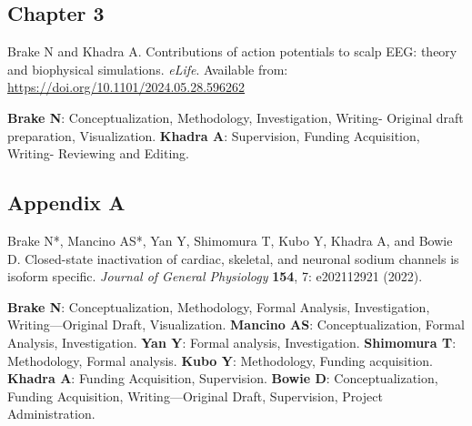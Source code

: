 \vspace{-.5em}
\subsection*{Chapter 3}
Brake N and Khadra A. Contributions of action potentials to scalp EEG: theory and biophysical simulations. \textit{eLife}. Available from: \url{https://doi.org/10.1101/2024.05.28.596262}

{\small \textbf{Brake N}: Conceptualization, Methodology, Investigation, Writing- Original draft preparation, Visualization. \textbf{Khadra A}: Supervision, Funding Acquisition, Writing- Reviewing and Editing.}

\vspace{-.5em}
\subsection*{Appendix A}

Brake N*, Mancino AS*, Yan Y, Shimomura T, Kubo Y, Khadra A, and Bowie D. Closed-state inactivation of cardiac, skeletal, and neuronal sodium channels is isoform specific. \textit{Journal of General Physiology} \textbf{154}, 7: e202112921 (2022).

{\small \textbf{Brake N}: Conceptualization, Methodology, Formal Analysis, Investigation, Writing—Original Draft, Visualization.  \textbf{Mancino AS}: Conceptualization, Formal Analysis, Investigation. \textbf{Yan Y}: Formal analysis, Investigation. \textbf{Shimomura T}: Methodology, Formal analysis. \textbf{Kubo Y}: Methodology, Funding acquisition. \textbf{Khadra A}: Funding Acquisition, Supervision. \textbf{Bowie D}: Conceptualization, Funding Acquisition, Writing—Original Draft, Supervision, Project Administration.}




\setlength{\parskip}{6pt}
\setlength{\parindent}{17pt}